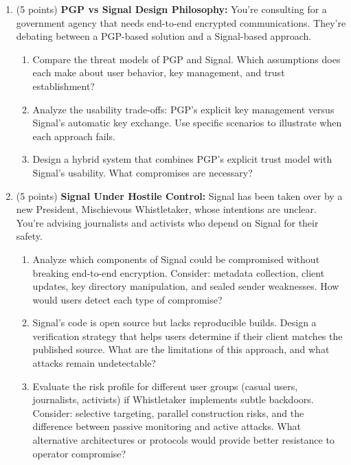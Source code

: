 \documentclass[10pt,a4paper,american]{article}
\begin{document}
\begin{enumerate}
	\item (5 points) \textbf{PGP vs Signal Design Philosophy:}
	      You're consulting for a government agency that needs end-to-end encrypted communications. They're debating between a PGP-based solution and a Signal-based approach.
	      \begin{enumerate}
		      \item Compare the threat models of PGP and Signal. Which assumptions does each make about user behavior, key management, and trust establishment?
		      \item Analyze the usability trade-offs: PGP's explicit key management versus Signal's automatic key exchange. Use specific scenarios to illustrate when each approach fails.
		      \item Design a hybrid system that combines PGP's explicit trust model with Signal's usability. What compromises are necessary?
	      \end{enumerate}

	\item (5 points) \textbf{Signal Under Hostile Control:}
	      Signal has been taken over by a new President, Mischievous Whistletaker, whose intentions are unclear. You're advising journalists and activists who depend on Signal for their safety.
	      \begin{enumerate}
		      \item Analyze which components of Signal could be compromised without breaking end-to-end encryption. Consider: metadata collection, client updates, key directory manipulation, and sealed sender weaknesses. How would users detect each type of compromise?
		      \item Signal's code is open source but lacks reproducible builds. Design a verification strategy that helps users determine if their client matches the published source. What are the limitations of this approach, and what attacks remain undetectable?
		      \item Evaluate the risk profile for different user groups (casual users, journalists, activists) if Whistletaker implements subtle backdoors. Consider: selective targeting, parallel construction risks, and the difference between passive monitoring and active attacks. What alternative architectures or protocols would provide better resistance to operator compromise?
	      \end{enumerate}


\end{enumerate}
\end{document}
